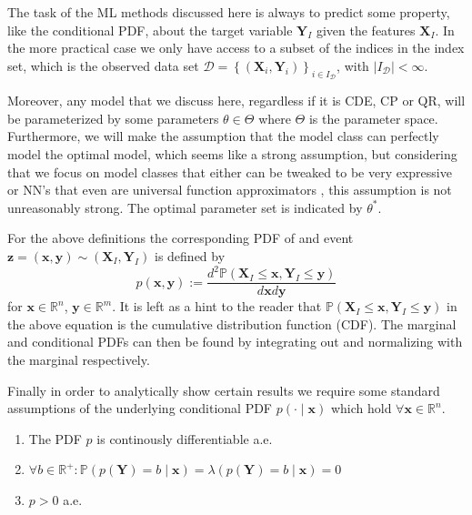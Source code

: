 The task of the ML methods discussed here is always to predict some property, like the conditional PDF, about the target variable $\mathbf{Y}_I$ given the features $\mathbf{X}_I$. %
In the more practical case we only have access to a subset of the indices in the index set, which is the observed data set $\mathcal{D} = \left\{(\mathbf{X}_i, \mathbf{Y}_i)\right\}_{i\in I_{\mathcal{D}}}$, with $|I_{\mathcal{D}}| < \infty$. 

Moreover, any model that we discuss here, regardless if it is CDE, CP or QR, will be parameterized by some parameters $\theta \in \Theta$ where $\Theta$ is the parameter space. Furthermore, we will make the assumption that the model class can perfectly model the optimal model, which seems like a strong assumption, but considering that we focus on model classes that either can be tweaked to be very expressive or NN's that even are universal function approximators \cite{HORNIK1989359}, this assumption is not unreasonably strong. The optimal parameter set is indicated by $\theta^*$.

For the above definitions the corresponding PDF of and event $\mathbf{z} = (\mathbf{x}, \mathbf{y}) \sim (\mathbf{X}_I, \mathbf{Y}_I)$ is defined by
\begin{equation}
    p(\mathbf{x}, \mathbf{y}):=\frac{d^2 \mathbb{P}(\mathbf{X}_I \leq
        \mathbf{x}, \mathbf{Y}_I \leq \mathbf{y})}{d \mathbf{x} d \mathbf{y}}
\end{equation}
for $\mathbf{x} \in \mathbb{R}^n$, $\mathbf{y}\in\mathbb{R}^m$. It is left as a hint to the reader that $\mathbb{P}(\mathbf{X}_I \leq
\mathbf{x}, \mathbf{Y}_I \leq \mathbf{y})$ in the above equation is the cumulative distribution function (CDF). The marginal and conditional PDFs can then be found by integrating out and normalizing with the marginal respectively.

Finally in order to analytically show certain results we require some standard assumptions of the underlying conditional PDF $p(\cdot\mid \mathbf{x})$ which hold $\forall \mathbf{x}\in \mathbb{R}^n$.

\begin{definition}\label{def:assumptions} %

    \begin{enumerate}
        \item The PDF $p$ is continously differentiable a.e.
        \item $\forall b\in\mathbb{R}^+: \mathbb{P}(p(\mathbf{Y}) = b\mid \mathbf{x}) = \lambda(p(\mathbf{Y}) = b \mid \mathbf{x}) = 0$
        \item $p > 0$ a.e.
    \end{enumerate}
\end{definition}

